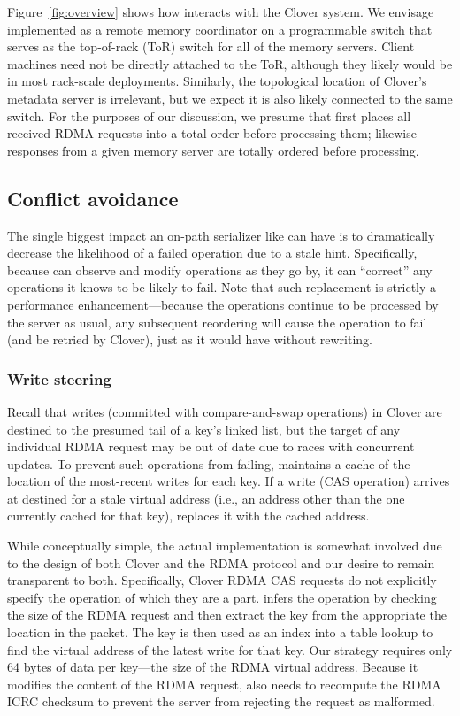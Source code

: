 Figure~\ref{fig:overview} shows how {\sword} interacts with the Clover
system.  We envisage {\sword} implemented as a remote memory coordinator
on a programmable switch that serves as the top-of-rack (ToR) switch
for all of the memory servers.  Client machines need not be directly
attached to the ToR, although they likely would be in most rack-scale
deployments.  Similarly, the topological location of Clover's metadata
server is irrelevant, but we expect it is also likely connected to the
same switch.  For the purposes of our discussion, we presume that
{\sword} first places all received RDMA requests into a total order
before processing them; likewise responses from a given memory
server are totally ordered before processing.

\subsection{Conflict avoidance}

The single biggest impact an on-path serializer like {\sword} can have
is to dramatically decrease the likelihood of a failed operation due
to a stale hint.  Specifically, because {\sword} can observe and
modify operations as they go by, it can ``correct'' any operations it
knows to be likely to fail.  Note that such replacement is strictly a
performance enhancement---because the operations continue to be
processed by the server as usual, any subsequent reordering will
cause the operation to fail (and be retried by Clover), just as
it would have without rewriting.

\subsubsection{Write steering}

Recall that writes (committed with compare-and-swap operations) in
Clover are destined to the presumed tail of a key's linked list, but
the target of any individual RDMA request may be out of date due to
races with concurrent updates.  To prevent such operations from
failing, {\sword} maintains a cache of the location of the most-recent writes
for each key. If a write (CAS operation) arrives at {\sword}
destined for a stale virtual address (i.e., an address other than the
one currently cached for that key), {\sword} replaces it with
the cached address.

While conceptually simple, the actual implementation is somewhat involved due to
the design of both Clover and the RDMA protocol and our desire to remain
transparent to both.  Specifically, Clover RDMA CAS requests do not explicitly
specify the operation of which they are a part.  {\sword} infers the operation
by checking the size of the RDMA request and then extract the key from the
appropriate the location in the packet.  The key is then used as an index into a
table lookup to find the virtual address of the latest write for that key.  Our
strategy requires only 64 bytes of data per key---the size of the RDMA virtual
address.  Because it modifies the content of the RDMA request, {\sword} also
needs to recompute the RDMA ICRC checksum to prevent the server from rejecting
the request as malformed.

